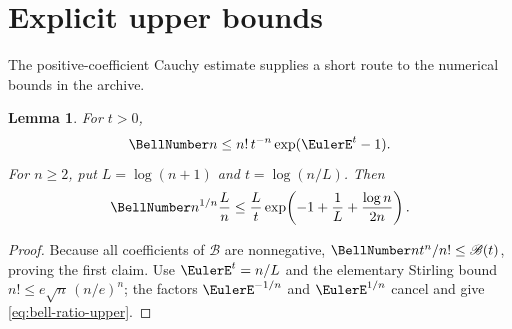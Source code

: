 \documentclass[11pt,a4paper,oneside,openany]{book}
\newtheorem{lemma}[theorem]{Lemma}
\theoremstyle{definition}
\theoremstyle{remark}
\begin{document}
\section{Explicit upper bounds}
The positive-coefficient Cauchy estimate supplies a short route to the numerical
bounds in the archive.
\begin{lemma}\label{lem:bell-coeff-upper}
For $t>0$,
\begin{equation}\label{eq:bell-coeff-upper}
 \BellNumber n\le n!\,t^{-n}\exp(\EulerE^t-1).
\end{equation}
For $n\ge2$, put $L=\log(n+1)$ and $t=\log(n/L)$.  Then
\begin{equation}\label{eq:bell-ratio-upper}
 \BellNumber n^{1/n}\frac{L}{n}
 \le \frac{L}{t}
 \exp\!\left(-1+\frac1L+\frac{\log n}{2n}\right).
\end{equation}
\end{lemma}
\begin{proof}
Because all coefficients of $\mathscr B$ are nonnegative,
$\BellNumber n t^n/n!\le\mathscr B(t)$, proving the first claim.  Use
$\EulerE^t=n/L$ and the elementary Stirling bound
$n!\le e\sqrt n\,(n/e)^n$; the factors $\EulerE^{-1/n}$ and $\EulerE^{1/n}$ cancel and give
\eqref{eq:bell-ratio-upper}.
\end{proof}
\end{document}
